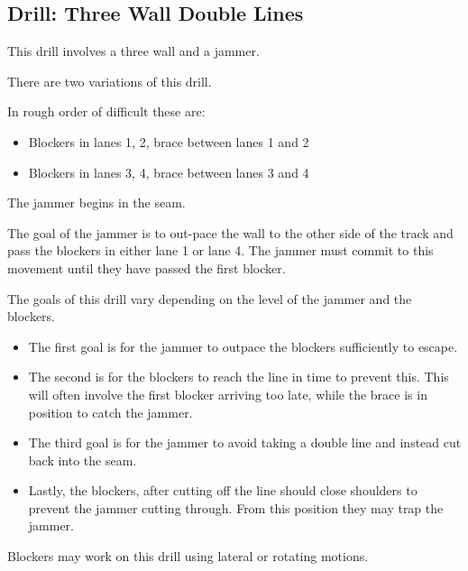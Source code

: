 \subsection*{Drill: Three Wall Double Lines}
\label{drill:three_wall/double_lines}

This drill involves a three wall and a jammer.

There are two variations of this drill.

In rough order of difficult these are:
\begin{itemize}
\item Blockers in lanes 1, 2, brace between lanes 1 and 2 
\item Blockers in lanes 3, 4, brace between lanes 3 and 4 
\end{itemize} 

The jammer begins in the seam. 

The goal of the jammer is to out-pace the wall to the other side of the track and pass the blockers in either lane 1 or lane 4.
The jammer must commit to this movement until they have passed the first blocker. 


The goals of this drill vary depending on the level of the jammer and the blockers.

\begin{itemize}
\item The first goal is for the jammer to outpace the blockers sufficiently to escape.
\item The second is for the blockers to reach the line in time to prevent this. This will often involve the first blocker arriving too late, while the brace is in position to catch the jammer.
\item The third goal is for the jammer to avoid taking a double line and instead cut back into the seam.
\item Lastly, the blockers, after cutting off the line should close shoulders to prevent the jammer cutting through. From this position they may trap the jammer.
\end{itemize}

Blockers may work on this drill using lateral or rotating motions.

